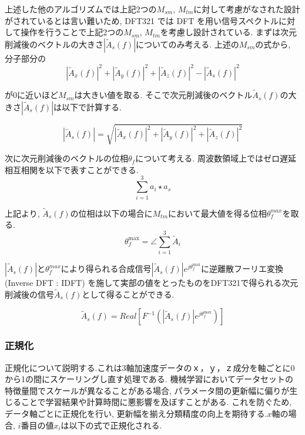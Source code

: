 上述した他のアルゴリズムでは上記2つの$M_{sm}$, $M_{t m}$に対して考慮がなされた設計がされているとは言い難いため, DFT321 では DFT を用い信号スペクトルに対して操作を行うことで上記2つの$M_{sm}$, $M_{t m}$を考慮し設計されている. 
まずは次元削減後のベクトルの大きさ$\left|\tilde{A}_{s}(f)\right|$についてのみ考える. 
上述の$M_{sm}$の式から, 分子部分の
\begin{equation}
{\left|\tilde{A}_{x}(f)\right|^{2}+\left|\tilde{A}_{y}(f)\right|^{2}+\left|\tilde{A}_{z}(f)\right|^{2}-\left|\tilde{A}_{s}(f)\right|^{2}}
\end{equation}

が0に近いほど$M_{sm}$は大きい値を取る. そこで次元削減後のベクトル${\tilde{A}_{s}(f)}$の大きさ$\left|\tilde{A}_{s}(f)\right|$は以下で計算する. 

\begin{equation}
{\left|\tilde{A}_{s}(f)\right|=\sqrt{\left|\tilde{A}_{x}(f)\right|^{2}+\left|\tilde{A}_{y}(f)\right|^{2}+\left|\tilde{A}_{z}(f)\right|^{2}}}
\end{equation}


次に次元削減後のベクトルの位相$\theta_{f}$について考える. 
周波数領域上ではゼロ遅延相互相関を以下で表すことができる. 
\begin{equation}
\sum_{i=1}^{3} a_{i} \star a_{s}
\end{equation}


上記より, ${\tilde{A}_{s}(f)}$の位相は以下の場合に$M_{t m}$において最大値を得る位相$\theta_{f}^{max}$を取る. 
\begin{equation}
{\theta_{f}^{\max }=\angle \sum_{i=1}^{3} \tilde{A}_{i}}
\end{equation}

$\left|\tilde{A}_{s}(f)\right|$と$\theta_{f}^{max}$により得られる合成信号${\left|\tilde{A}_{s}(f)\right|e^{j \theta_{f}^{\max }}}$に逆離散フーリエ変換(Inverse DFT : IDFT) を施して実部の値をとったものをDFT321で得られる次元削減後の信号${\tilde{A}_{s}(f)}$として得ることができる. 

\begin{equation}
{{\tilde{A}_{s}(f) = Real[{F^{-1}({\left|\tilde{A}_{s}(f)\right|e^{j\theta_{f}^{\max }}})}]}}
\end{equation}

\subsubsection{正規化}
正規化について説明する.これは3軸加速度データの$ｘ$，$ｙ$，$ｚ$成分を軸ごとに0から1の間にスケーリングし直す処理である. 
機械学習においてデータセットの特徴量間でスケールが異なることがある場合, パラメータ間の更新幅に偏りが生じることで学習結果や計算時間に悪影響を及ぼすことがある. これを防ぐため, データ軸ごとに正規化を行い, 更新幅を揃え分類精度の向上を期待する.$x$軸の場合, $i$番目の値$x_{i}$は以下の式で正規化される. 

